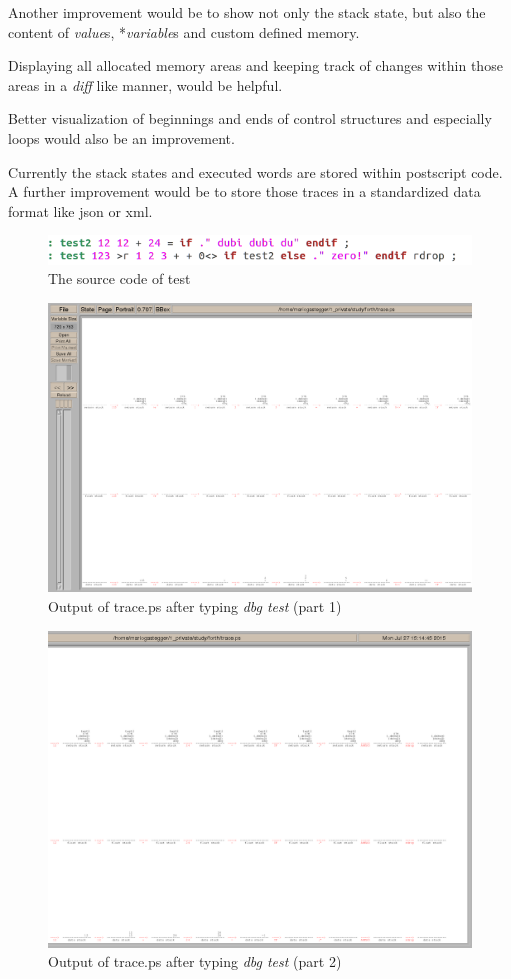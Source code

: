 Another improvement would be to show not only the stack state, but also the content of \emph{value}s, *\emph{variable}s and custom defined memory.

Displaying all allocated memory areas and keeping track of changes within those areas in a \emph{diff} like manner,  would be helpful.

Better visualization of beginnings and ends of control structures and especially loops would also be an improvement.

Currently the stack states and executed words are stored within postscript code. A further improvement would be to store those traces in a standardized data format like json or xml.

\begin{figure}[p]
    \centering
    \includegraphics[scale=0.50]{graphics/gfvis-test+test2_src.png}
    \caption{The source code of test}
    \label{fig:gfvis-test-src}
\end{figure}

\begin{figure}[p]
    \centering
    \includegraphics[scale=0.30]{graphics/traceps1.png}
    \caption{Output of trace.ps after typing \emph{dbg test} (part 1)}
    \label{fig:traceps1}
\end{figure}

\begin{figure}[p]
    \centering
    \includegraphics[scale=0.30]{graphics/traceps2.png}
    \caption{Output of trace.ps after typing \emph{dbg test} (part 2)}
    \label{fig:traceps2}
\end{figure}